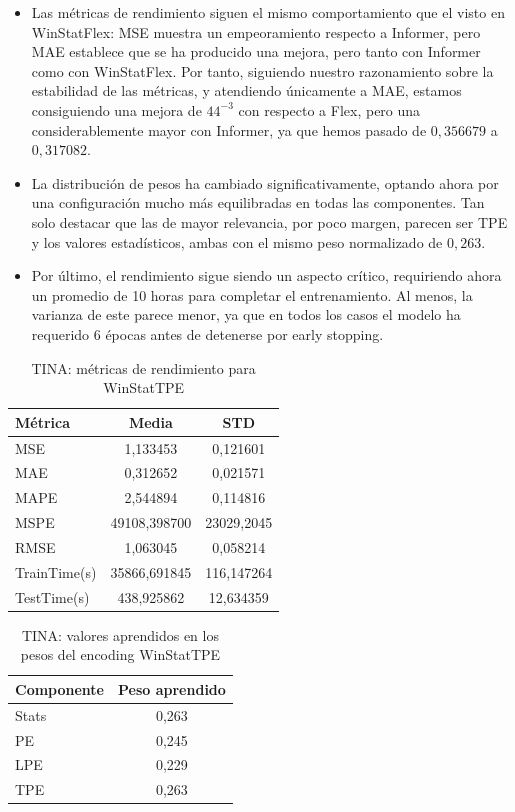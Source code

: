 \begin{itemize}
	\item Las métricas de rendimiento siguen el mismo comportamiento que el visto en WinStatFlex: MSE muestra un empeoramiento respecto a Informer, pero MAE establece que se ha producido una mejora, pero tanto con Informer como con WinStatFlex. Por tanto, siguiendo nuestro razonamiento sobre la estabilidad de las métricas, y atendiendo únicamente a MAE, estamos consiguiendo una mejora de $44^{-3}$ con respecto a Flex, pero una considerablemente mayor con Informer, ya que hemos pasado de $0,356679$ a $0,317082$.
	
	\item La distribución de pesos ha cambiado significativamente, optando ahora por una configuración mucho más equilibradas en todas las componentes. Tan solo destacar que las de mayor relevancia, por poco margen, parecen ser TPE y los valores estadísticos, ambas con el mismo peso normalizado de $0,263$.
	
	\item Por último, el rendimiento sigue siendo un aspecto crítico, requiriendo ahora un promedio de 10 horas para completar el entrenamiento. Al menos, la varianza de este parece menor, ya que en todos los casos el modelo ha requerido 6 épocas antes de detenerse por early stopping.
\end{itemize}


\begin{table}[!ht]
	\centering
	\begin{tabular}{l|c|c}
		\toprule
		Métrica & Media & STD \\
		\midrule
		MSE & 1,133453 & 0,121601 \\
		MAE & 0,312652 & 0,021571 \\
		MAPE & 2,544894 & 0,114816 \\
		MSPE & 49108,398700 & 23029,2045 \\
		RMSE & 1,063045 & 0,058214 \\
		TrainTime(s) & 35866,691845 & 116,147264 \\
		TestTime(s) & 438,925862 & 12,634359 \\
		\bottomrule
	\end{tabular}
	\caption{TINA: métricas de rendimiento para WinStatTPE}
	\label{tinatpe}
\end{table}

\begin{table}[!ht]
	\centering
	\begin{tabular}{l|c}
		\toprule
		Componente & Peso aprendido \\
		\midrule
		Stats & 0,263 \\
		PE & 0,245 \\
		LPE & 0,229 \\
		TPE & 0,263 \\
		\bottomrule
	\end{tabular}
	\caption{TINA: valores aprendidos en los pesos del encoding WinStatTPE}
	\label{tinatpepesos}
\end{table}

